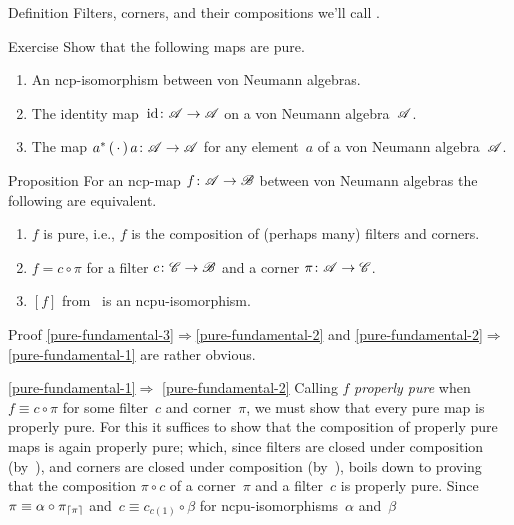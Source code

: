 \documentclass[a]{subfiles}
\begin{document}
\begin{parsec}%
\begin{point}[pure]{Definition}%
Filters, corners,
and their compositions we'll call .%
\end{point}
\begin{point}{Exercise}%
Show that the following maps are pure.
\begin{enumerate}%
\item
An ncp-isomorphism between von Neumann algebras.
\item
The identity map~$\operatorname{id}\colon \mathscr{A}\to\mathscr{A}$
on a von Neumann algebra~$\mathscr{A}$.
\item
The map $a^*\,(\,\cdot\,)\,a\colon \mathscr{A}\to\mathscr{A}$
for any element~$a$ of a von Neumann algebra~$\mathscr{A}$.
\end{enumerate}
\end{point}
\begin{point}{Proposition}%
For an ncp-map $f\colon \mathscr{A}\to\mathscr{B}$ between von Neumann algebras
the following are equivalent.
\begin{enumerate}
\item 
\label{pure-fundamental-1}
	$f$ is pure, i.e., $f$ is the composition
	of (perhaps many) filters and corners.
\item
\label{pure-fundamental-2}
	$f = c\circ \pi$ for a filter $c\colon \mathscr{C}\to\mathscr{B}$
	and a corner $\pi\colon \mathscr{A}\to\mathscr{C}$.
\item
\label{pure-fundamental-3}
	$[f]$ from~ is an ncpu-isomorphism.
\end{enumerate}
\begin{point}{Proof}%
\ref{pure-fundamental-3}$\Longrightarrow$\ref{pure-fundamental-2}
and \ref{pure-fundamental-2}$\Longrightarrow$\ref{pure-fundamental-1}
are rather obvious.
\begin{point}{\ref{pure-fundamental-1}$\Longrightarrow$%
\ref{pure-fundamental-2}}%
Calling $f$ \emph{properly pure}
when~$f\equiv c\circ \pi$
for some filter~$c$ and corner~$\pi$,
we must show that every pure map is properly pure.
For this it suffices to show that the composition of properly
pure maps is again properly pure;
which,
since filters are closed under composition
(by~),
and corners are closed under composition
(by~),
boils down to proving that the composition
$\pi\circ c$ of a corner~$\pi$ and a filter~$c$
is properly pure.
Since~$\pi\equiv \alpha\circ \pi_{\left\lceil\pi\right\rceil}$
and~$c\equiv c_{c(1)}\circ \beta$
for ncpu-isomorphisms~$\alpha$ and~$\beta$

\end{point}
\end{point}
\end{point}
\end{parsec}
\end{document}
